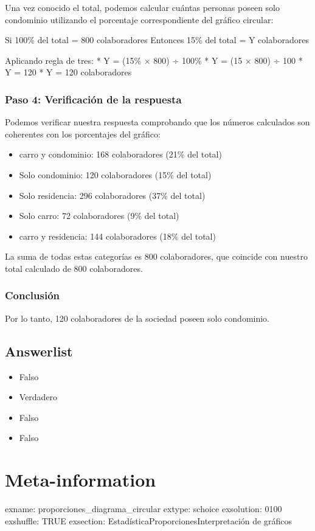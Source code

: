 \documentclass[
]{article}
\providecommand{\tightlist}{%
  \setlength{\itemsep}{0pt}\setlength{\parskip}{0pt}}
\begin{document}
Una vez conocido el total, podemos calcular cuántas personas poseen solo
condominio utilizando el porcentaje correspondiente del gráfico
circular:

Si 100\% del total = 800 colaboradores Entonces 15\% del total = Y
colaboradores

Aplicando regla de tres: * Y = (15\% × 800) ÷ 100\% * Y = (15 × 800) ÷
100 * Y = 120 * Y = 120 colaboradores

\subsubsection{Paso 4: Verificación de la
respuesta}\label{paso-4-verificaciuxf3n-de-la-respuesta}

Podemos verificar nuestra respuesta comprobando que los números
calculados son coherentes con los porcentajes del gráfico:

\begin{itemize}
\tightlist
\item
  carro y condominio: 168 colaboradores (21\% del total)
\item
  Solo condominio: 120 colaboradores (15\% del total)
\item
  Solo residencia: 296 colaboradores (37\% del total)
\item
  Solo carro: 72 colaboradores (9\% del total)
\item
  carro y residencia: 144 colaboradores (18\% del total)
\end{itemize}

La suma de todas estas categorías es 800 colaboradores, que coincide con
nuestro total calculado de 800 colaboradores.

\subsubsection{Conclusión}\label{conclusiuxf3n}

Por lo tanto, 120 colaboradores de la sociedad poseen solo condominio.

\subsection{Answerlist}\label{answerlist-1}

\begin{itemize}
\tightlist
\item
  Falso
\item
  Verdadero
\item
  Falso
\item
  Falso
\end{itemize}

\section{Meta-information}\label{meta-information}

exname: proporciones\_diagrama\_circular extype: schoice exsolution:
0100 exshuffle: TRUE exsection:
Estadística\textbar Proporciones\textbar Interpretación de gráficos
\end{document}
